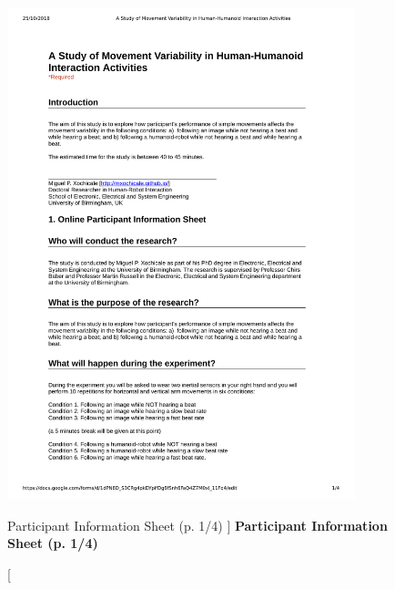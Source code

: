\begin{figure}
 \centering
   \includegraphics[width=0.9\textwidth]{epi1}
   \caption
	[Participant Information Sheet (p. 1/4) ]{
	{\bf Participant Information Sheet (p. 1/4)}
}
   \label{fig:epi1}
\end{figure}
